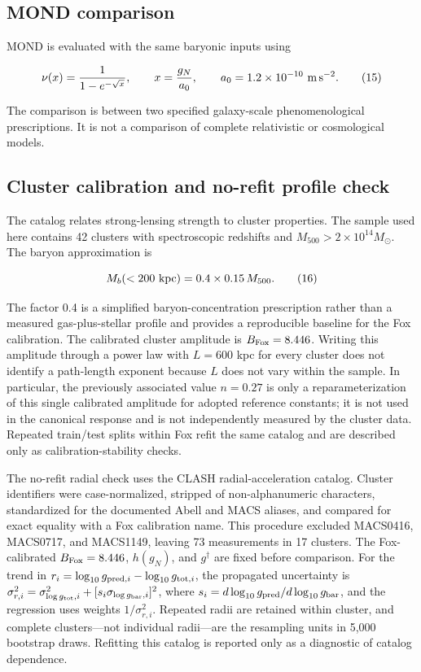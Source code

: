 \documentclass[utf8]{FrontiersinHarvard}
\begin{document}
\subsection{MOND comparison}\label{mond-comparison}

MOND is evaluated with the same baryonic inputs using

\[
\nu(x)=\frac{1}{1-e^{-\sqrt{x}}},
\qquad x=\frac{g_N}{a_0},
\qquad a_0=1.2\times10^{-10}\ {\rm m\,s^{-2}} .
\tag{15}
\]

The comparison is between two specified galaxy-scale phenomenological prescriptions. It is not a comparison of complete relativistic or cosmological models.

\subsection{Cluster calibration and no-refit profile check}\label{cluster-calibration-and-no-refit-profile-check}

The \citet{fox2022} catalog relates strong-lensing strength to cluster properties. The sample used here contains 42 clusters with spectroscopic redshifts and \(M_{500}>2\times10^{14}M_\odot\). The baryon approximation is

\[
M_b(<200\ {\rm kpc})=0.4\times0.15\,M_{500}.
\tag{16}
\]

The factor 0.4 is a simplified baryon-concentration prescription rather than a measured gas-plus-stellar profile and provides a reproducible baseline for the Fox calibration. The calibrated cluster amplitude is \(B_{\rm Fox}=8.446\). Writing this amplitude through a power law with \(L=600\) kpc for every cluster does not identify a path-length exponent because \(L\) does not vary within the sample. In particular, the previously associated value \(n=0.27\) is only a reparameterization of this single calibrated amplitude for adopted reference constants; it is not used in the canonical response and is not independently measured by the cluster data. Repeated train/test splits within Fox refit the same catalog and are described only as calibration-stability checks.

The no-refit radial check uses the \citet{tian2020} CLASH radial-acceleration catalog. Cluster identifiers were case-normalized, stripped of non-alphanumeric characters, standardized for the documented Abell and MACS aliases, and compared for exact equality with a Fox calibration name. This procedure excluded MACS0416, MACS0717, and MACS1149, leaving 73 measurements in 17 clusters. The Fox-calibrated \(B_{\rm Fox}=8.446\), \(h(g_N)\), and \(g^\dagger\) are fixed before comparison. For the trend in \(r_i=\log_{10}g_{{\rm pred},i}-\log_{10}g_{{\rm tot},i}\), the propagated uncertainty is \(\sigma_{r,i}^2=\sigma_{\log g_{\rm tot},i}^2+[s_i\sigma_{\log g_{\rm bar},i}]^2\), where \(s_i=d\log_{10}g_{\rm pred}/d\log_{10}g_{\rm bar}\), and the regression uses weights \(1/\sigma_{r,i}^2\). Repeated radii are retained within cluster, and complete clusters---not individual radii---are the resampling units in 5,000 bootstrap draws. Refitting this catalog is reported only as a diagnostic of catalog dependence.
\end{document}
